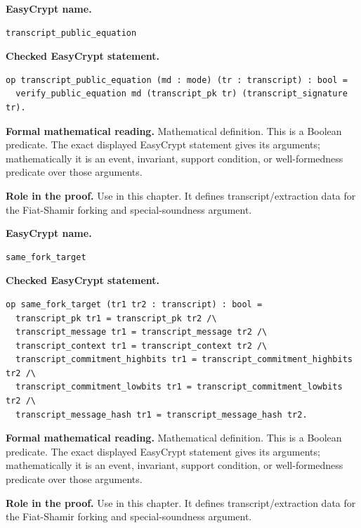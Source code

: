 \begin{formaldefinition}
\noindent\textbf{EasyCrypt name.}
\begin{lstlisting}[language=EasyCrypt,basicstyle=\ttfamily\scriptsize]
transcript_public_equation
\end{lstlisting}
\noindent\textbf{Checked EasyCrypt statement.}
\begin{lstlisting}[language=EasyCrypt,basicstyle=\ttfamily\scriptsize]
op transcript_public_equation (md : mode) (tr : transcript) : bool =
  verify_public_equation md (transcript_pk tr) (transcript_signature tr).
\end{lstlisting}
\noindent\textbf{Formal mathematical reading.}
Mathematical definition. This is a Boolean predicate.  The exact displayed EasyCrypt statement gives its arguments; mathematically it is an event, invariant, support condition, or well-formedness predicate over those arguments.

\noindent\textbf{Role in the proof.}
Use in this chapter. It defines transcript/extraction data for the Fiat-Shamir forking and special-soundness argument.

\end{formaldefinition}

\begin{formaldefinition}
\noindent\textbf{EasyCrypt name.}
\begin{lstlisting}[language=EasyCrypt,basicstyle=\ttfamily\scriptsize]
same_fork_target
\end{lstlisting}
\noindent\textbf{Checked EasyCrypt statement.}
\begin{lstlisting}[language=EasyCrypt,basicstyle=\ttfamily\scriptsize]
op same_fork_target (tr1 tr2 : transcript) : bool =
  transcript_pk tr1 = transcript_pk tr2 /\
  transcript_message tr1 = transcript_message tr2 /\
  transcript_context tr1 = transcript_context tr2 /\
  transcript_commitment_highbits tr1 = transcript_commitment_highbits tr2 /\
  transcript_commitment_lowbits tr1 = transcript_commitment_lowbits tr2 /\
  transcript_message_hash tr1 = transcript_message_hash tr2.
\end{lstlisting}
\noindent\textbf{Formal mathematical reading.}
Mathematical definition. This is a Boolean predicate.  The exact displayed EasyCrypt statement gives its arguments; mathematically it is an event, invariant, support condition, or well-formedness predicate over those arguments.

\noindent\textbf{Role in the proof.}
Use in this chapter. It defines transcript/extraction data for the Fiat-Shamir forking and special-soundness argument.

\end{formaldefinition}

